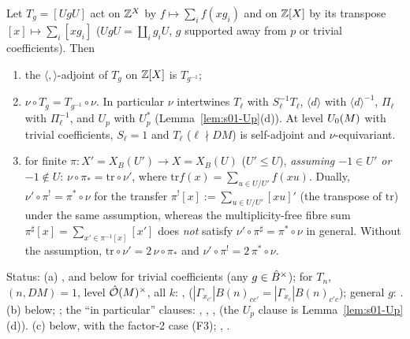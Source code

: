 \begin{proposition}\label{prop:s01-adjoint}
Let $T_g=[UgU]$ act on $\mathbb{Z}^X$ by $f\mapsto\sum_if(xg_i)$ and on $\mathbb{Z}[X]$ by its transpose $[x]\mapsto\sum_i[xg_i]$
($UgU=\coprod_ig_iU$, $g$ supported away from $p$ or trivial coefficients). Then
\begin{enumerate}[label=(\alph*)]
\item the $\langle,\rangle$-adjoint of $T_g$ on $\mathbb{Z}[X]$ is $T_{g^{-1}}$;
\item $\nu\circ T_g=T_{g^{-1}}\circ\nu$. In particular $\nu$ intertwines $T_\ell$ with $S_\ell^{-1}T_\ell$, $\langle d\rangle$ with
  $\langle d\rangle^{-1}$, $\Pi_\ell$ with $\Pi_\ell^{-1}$, and $U_p$ with $U_p^{*}$ (Lemma~\ref{lem:s01-Up}(d)). At level
  $U_0(M)$ with trivial coefficients, $S_\ell=1$ and $T_\ell$ ($\ell\nmid DM$) is self-adjoint and $\nu$-equivariant.
\item for finite $\pi:X'=X_B(U')\to X=X_B(U)$ ($U'\le U$), \emph{assuming $-1\in U'$ or $-1\notin U$}: $\nu\circ\pi_*=\mathrm{tr}\circ\nu'$, where
  $\mathrm{tr}f(x)=\sum_{u\in U/U'}f(xu)$. Dually, $\nu'\circ\pi^!=\pi^*\circ\nu$ for the transfer
  $\pi^![x]:=\sum_{u\in U/U'}[xu]'$ (the transpose of $\mathrm{tr}$) under the same assumption, whereas the multiplicity-free fibre sum
  $\pi^\sharp[x]=\sum_{x'\in\pi^{-1}[x]}[x']$ does \emph{not} satisfy $\nu'\circ\pi^\sharp=\pi^*\circ\nu$ in general.
  Without the assumption, $\mathrm{tr}\circ\nu'=2\,\nu\circ\pi_*$ and $\nu'\circ\pi^!=2\,\pi^*\circ\nu$.
\end{enumerate}
Status: (a) \stcited{} , and \stproved{} below for trivial coefficients (any $g\in\hat{B}^\times$); \stformal{} for $T_n$, $(n,DM)=1$, level $\hat{\mathcal{O}}(M)^\times$, all $k$:
 ,  
($|\Gamma_{x_{c'}}|B(n)_{cc'}=|\Gamma_{x_c}|B(n)_{c'c}$); general $g$:  \stformal{}.
(b) \stproved{} below;  \stformal{}; the ``in particular'' clauses:
, , ,
 \stformal{} (the $U_p$ clause is Lemma~\ref{lem:s01-Up}(d)).
(c) \stproved{} below, with the factor-2 case (F3); ,
 \stformal{}.
\end{proposition}

